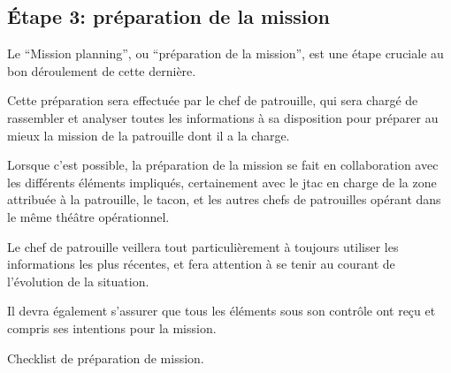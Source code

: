 \subsection{Étape 3: préparation de la mission}

\begin{e1}
	\item Le ``Mission planning'', ou ``préparation de la mission'', est une étape cruciale au bon déroulement de cette dernière.
	\item Cette préparation sera effectuée par le chef de patrouille, qui sera chargé de rassembler et analyser toutes les informations à sa disposition pour préparer au mieux la mission de la patrouille dont il a la charge.
	\item Lorsque c'est possible, la préparation de la mission se fait en collaboration avec les différents éléments impliqués, certainement avec le \gls{jtac} en charge de la zone attribuée à la patrouille, le \gls{tacon}, et les autres chefs de patrouilles opérant dans le même théâtre opérationnel.
	\item Le chef de patrouille veillera tout particulièrement à toujours utiliser les informations les plus récentes, et fera attention à se tenir au courant de l'évolution de la situation.
	\item Il devra également s'assurer que tous les éléments sous son contrôle ont reçu et compris ses intentions pour la mission.
	\item Checklist de préparation de mission. 
\end{e1}



